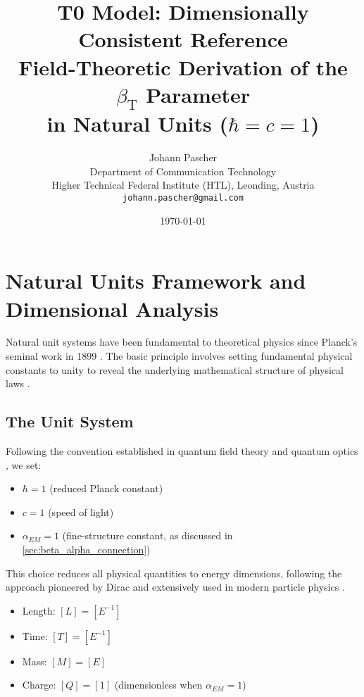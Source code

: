 \documentclass[12pt,a4paper]{article}
\newcommand{\betaT}{\beta_{\text{T}}}
\begin{document}
	
	\title{T0 Model: Dimensionally Consistent Reference \\
		Field-Theoretic Derivation of the $\betaT$ Parameter \\
		in Natural Units ($\hbar = c = 1$)}
	\author{Johann Pascher\\
		Department of Communication Technology\\
		Higher Technical Federal Institute (HTL), Leonding, Austria\\
		\texttt{johann.pascher@gmail.com}}
	\date{\today}
	
	\maketitle
	\tableofcontents
	\newpage
	
	\section{Natural Units Framework and Dimensional Analysis}
	\label{sec:natural_units}
	
	Natural unit systems have been fundamental to theoretical physics since Planck's seminal work in 1899 \citep{planck1900,planck1906}. The basic principle involves setting fundamental physical constants to unity to reveal the underlying mathematical structure of physical laws \citep{weinberg1995,peskin1995}.
	
	\subsection{The Unit System}
	\label{subsec:unit_system}
	
	Following the convention established in quantum field theory \citep{peskin1995,weinberg1995} and quantum optics \citep{scully1997}, we set:
	\begin{itemize}
		\item $\hbar = 1$ (reduced Planck constant)
		\item $c = 1$ (speed of light)
		\item $\alpha_{EM} = 1$ (fine-structure constant, as discussed in \cref{sec:beta_alpha_connection})
	\end{itemize}
	
	This choice reduces all physical quantities to energy dimensions, following the approach pioneered by Dirac \citep{dirac1958} and extensively used in modern particle physics \citep{griffiths2008}.
	
	\begin{tcolorbox}[colback=blue!5!white,colframe=blue!75!black,title=Dimensions in Natural Units \citep{weinberg1995}]
		\begin{itemize}
			\item Length: $[L] = [E^{-1}]$
			\item Time: $[T] = [E^{-1}]$ 
			\item Mass: $[M] = [E]$
			\item Charge: $[Q] = [1]$ (dimensionless when $\alpha_{EM} = 1$)
		\end{itemize}
	\end{tcolorbox}
	
\end{document}
